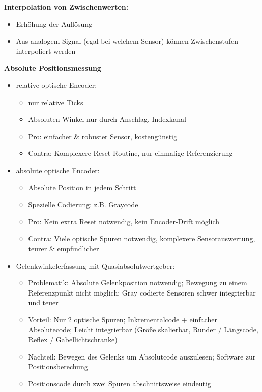 \textbf{Interpolation von Zwischenwerten:}
\begin{itemize}
\setlength\itemsep{0em}
\item Erhöhung der Auflösung
\item Aus analogem Signal (egal bei welchem Sensor) können Zwischenstufen interpoliert werden
\end{itemize}

\textbf{Absolute Positionsmessung}
\begin{itemize}
\setlength\itemsep{0em}
\item relative optische Encoder:
\begin{itemize}
\setlength\itemsep{0em}
\item nur relative Ticks
\item Absoluten Winkel nur durch Anschlag, Indexkanal
\item Pro: einfacher \& robuster Sensor, kostengünstig
\item Contra: Komplexere Reset-Routine, nur einmalige Referenzierung
\end{itemize}
\item absolute optische Encoder: 
\begin{itemize}
\setlength\itemsep{0em}
\item Absolute Position in jedem Schritt
\item Spezielle Codierung: z.B. Graycode
\item Pro: Kein extra Reset notwendig, kein Encoder-Drift möglich
\item Contra: Viele optische Spuren notwendig, komplexere Sensorauswertung, teurer \& empfindlicher
\end{itemize}
\item Gelenkwinkelerfassung mit Quasiabsolutwertgeber:
\begin{itemize}
\setlength\itemsep{0em}
\item Problematik: Absolute Gelenkposition notwendig; Bewegung zu einem Referenzpunkt nicht möglich; Gray codierte Sensoren schwer integrierbar und teuer
\item Vorteil: Nur 2 optische Spuren; Inkrementalcode + einfacher Absolutecode; Leicht integrierbar (Größe skalierbar, Runder / Längscode, Reflex / Gabellichtschranke)
\item Nachteil: Bewegen des Gelenks um Absolutcode auszulesen; Software zur Positionsberechung
\item Positionscode durch zwei Spuren abschnittsweise eindeutig
\end{itemize}
\end{itemize}
